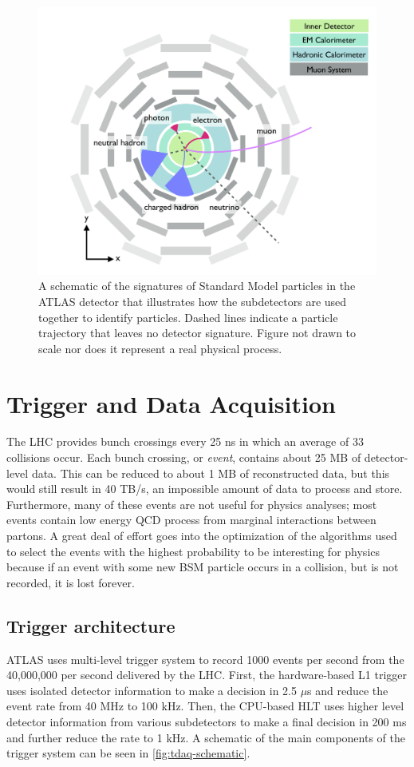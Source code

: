 \begin{figure}[htbp]
\centering
\includegraphics[width=.6\textwidth]{figures/Detector/particle-doodle.png}
\caption{A schematic of the signatures of Standard Model particles in the \ac{ATLAS} detector that illustrates how the subdetectors are used together to identify particles. Dashed lines indicate a particle trajectory that leaves no detector signature. Figure not drawn to scale nor does it represent a real physical process.}
\label{fig:particle-doodles}
\end{figure}


\section{Trigger and Data Acquisition}
\label{sec:daq}

The \ac{LHC} provides bunch crossings every 25 ns in which an average of 33 collisions occur. Each bunch crossing, or \emph{event}, contains about 25 MB of detector-level data. This can be reduced to about 1 MB of reconstructed data, but this would still result in 40 TB/s, an impossible amount of data to process and store. Furthermore, many of these events are not useful for physics analyses; most events contain low energy \ac{QCD} process from marginal interactions between partons. A great deal of effort goes into the optimization of the algorithms used to select the events with the highest probability to be interesting for physics because if an event with some new \ac{BSM} particle occurs in a collision, but is not recorded, it is lost forever.


\subsection{Trigger architecture}

\ac{ATLAS} uses multi-level trigger system to record 1000 events per second from the 40,000,000 per second delivered by the \ac{LHC}. First, the hardware-based \ac{L1} trigger uses isolated detector information to make a decision in 2.5 $\mu$s and reduce the event rate from 40 MHz to 100 kHz. Then, the CPU-based \ac{HLT} uses higher level detector information from various subdetectors to make a final decision in 200 ms and further reduce the rate to 1 kHz. A schematic of the main components of the trigger system can be seen in \autoref{fig:tdaq-schematic}.


